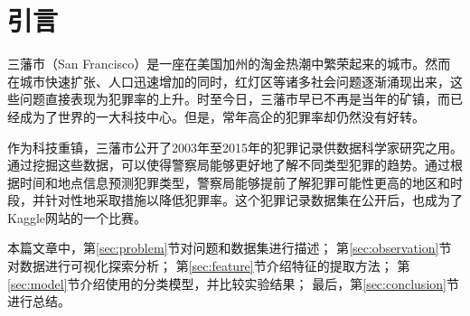 \section{引言}
\label{sec:intro}

三藩市（San Francisco）是一座在美国加州的淘金热潮中繁荣起来的城市。然而在城市快速扩张、人口迅速增加的同时，红灯区等诸多社会问题逐渐涌现出来，这些问题直接表现为犯罪率的上升。时至今日，三藩市早已不再是当年的矿镇，而已经成为了世界的一大科技中心。但是，常年高企的犯罪率却仍然没有好转。

作为科技重镇，三藩市公开了2003年至2015年的犯罪记录供数据科学家研究之用。通过挖掘这些数据，可以使得警察局能够更好地了解不同类型犯罪的趋势。通过根据时间和地点信息预测犯罪类型，警察局能够提前了解犯罪可能性更高的地区和时段，并针对性地采取措施以降低犯罪率。这个犯罪记录数据集在公开后，也成为了Kaggle网站的一个比赛。

本篇文章中，第\ref{sec:problem}节对问题和数据集进行描述；
第\ref{sec:observation}节对数据进行可视化探索分析；
第\ref{sec:feature}节介绍特征的提取方法；
第\ref{sec:model}节介绍使用的分类模型，并比较实验结果；
最后，第\ref{sec:conclusion}节进行总结。